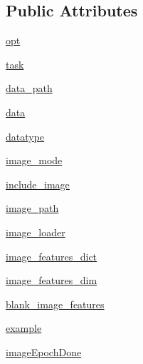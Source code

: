 \subsection*{Public Attributes}
\begin{DoxyCompactItemize}
\item 
\hyperlink{classparlai_1_1core_1_1teachers_1_1AbstractImageTeacher_aa7ca0df94cb27a11487e40343cc84de6}{opt}
\item 
\hyperlink{classparlai_1_1core_1_1teachers_1_1AbstractImageTeacher_a78dca77e43183d22d75140ca113d821c}{task}
\item 
\hyperlink{classparlai_1_1core_1_1teachers_1_1AbstractImageTeacher_a9fb2d3ab4b52f70872460c624bad1218}{data\+\_\+path}
\item 
\hyperlink{classparlai_1_1core_1_1teachers_1_1AbstractImageTeacher_a4015f3b73718e13896bb464378a269f1}{data}
\item 
\hyperlink{classparlai_1_1core_1_1teachers_1_1AbstractImageTeacher_a335cba069093a1e1cff8f73fad9f11d1}{datatype}
\item 
\hyperlink{classparlai_1_1core_1_1teachers_1_1AbstractImageTeacher_a72abb2921076e7597cc946275983028b}{image\+\_\+mode}
\item 
\hyperlink{classparlai_1_1core_1_1teachers_1_1AbstractImageTeacher_a0e4ee3692e19e0f1df2fef8f21d058ab}{include\+\_\+image}
\item 
\hyperlink{classparlai_1_1core_1_1teachers_1_1AbstractImageTeacher_aff2a7f405e051f014ece5cc124aa170c}{image\+\_\+path}
\item 
\hyperlink{classparlai_1_1core_1_1teachers_1_1AbstractImageTeacher_aaf426bd12c83e8f8d5a217481cbf854b}{image\+\_\+loader}
\item 
\hyperlink{classparlai_1_1core_1_1teachers_1_1AbstractImageTeacher_a67fc5068ab7e2c1c718614cc737d6a75}{image\+\_\+features\+\_\+dict}
\item 
\hyperlink{classparlai_1_1core_1_1teachers_1_1AbstractImageTeacher_a708601003f79d10c98a1933501ce658f}{image\+\_\+features\+\_\+dim}
\item 
\hyperlink{classparlai_1_1core_1_1teachers_1_1AbstractImageTeacher_a0c48c489fee91d94cf8d62b902bd6b27}{blank\+\_\+image\+\_\+features}
\item 
\hyperlink{classparlai_1_1core_1_1teachers_1_1AbstractImageTeacher_a404b2e622780e94083ba9539ebaab609}{example}
\item 
\hyperlink{classparlai_1_1core_1_1teachers_1_1AbstractImageTeacher_a5e814d24d81975556ee474c89d5fee5a}{image\+Epoch\+Done}
\end{DoxyCompactItemize}
